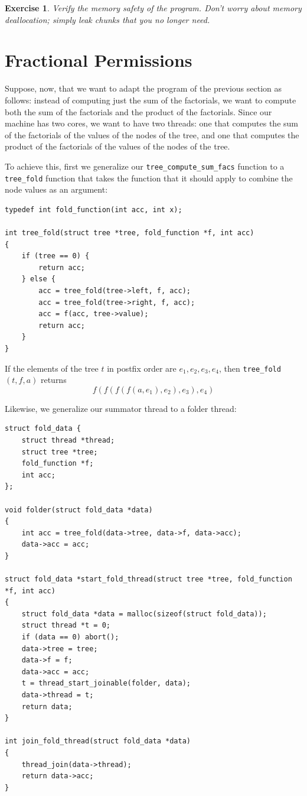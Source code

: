 \documentclass{article}
\newtheorem{exercise}{Exercise}
\begin{document}
\begin{exercise}\label{exercise:threads}
Verify the memory safety of the program. Don't worry about memory deallocation;
simply leak chunks that you no longer need.
\end{exercise}

\section{Fractional Permissions}\label{section:fractions}

Suppose, now, that we want to adapt the program of the previous
section as follows: instead of computing just the sum of the
factorials, we want to compute both the sum of the factorials and
the product of the factorials. Since our machine has two cores,
we want to have two threads: one that computes the sum of the
factorials of the values of the nodes of the tree, and one that
computes the product of the factorials of the values of the
nodes of the tree.

To achieve this, first we generalize our
\lstinline!tree_compute_sum_facs! function to a
\lstinline!tree_fold! function that takes the function that it
should apply to combine the node values as an argument:

\begin{lstlisting}
typedef int fold_function(int acc, int x);

int tree_fold(struct tree *tree, fold_function *f, int acc)
{
    if (tree == 0) {
        return acc;
    } else {
        acc = tree_fold(tree->left, f, acc);
        acc = tree_fold(tree->right, f, acc);
        acc = f(acc, tree->value);
        return acc;
    }
}
\end{lstlisting}

If the elements of the tree $t$ in postfix order are $e_1, e_2,
e_3, e_4$, then \lstinline!tree_fold!$(t, f, a)$ returns
$$f(f(f(f(a, e_1), e_2), e_3), e_4)$$

Likewise, we generalize our summator thread to a folder thread:

\begin{lstlisting}
struct fold_data {
    struct thread *thread;
    struct tree *tree;
    fold_function *f;
    int acc;
};

void folder(struct fold_data *data)
{
    int acc = tree_fold(data->tree, data->f, data->acc);
    data->acc = acc;
}

struct fold_data *start_fold_thread(struct tree *tree, fold_function *f, int acc)
{
    struct fold_data *data = malloc(sizeof(struct fold_data));
    struct thread *t = 0;
    if (data == 0) abort();
    data->tree = tree;
    data->f = f;
    data->acc = acc;
    t = thread_start_joinable(folder, data);
    data->thread = t;
    return data;
}

int join_fold_thread(struct fold_data *data)
{
    thread_join(data->thread);
    return data->acc;
}
\end{lstlisting}
\end{document}
